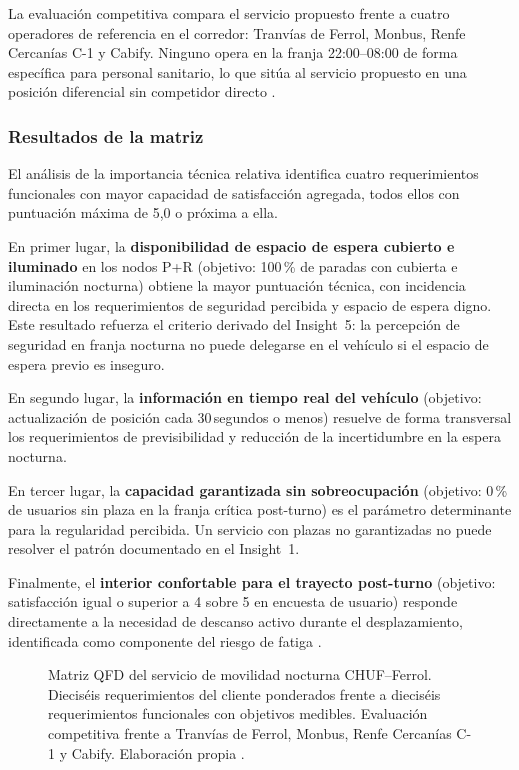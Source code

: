 La evaluación competitiva compara el servicio propuesto frente a cuatro
operadores de referencia en el corredor: Tranvías de Ferrol, Monbus,
Renfe Cercanías C-1 y Cabify. Ninguno opera en la franja 22:00--08:00
de forma específica para personal sanitario, lo que sitúa al servicio
propuesto en una posición diferencial sin competidor directo
\parencite{Alsaferrol2024horarios,RenfeCercaniasFerrol2026}.

\subsubsection{Resultados de la matriz}
\label{sec:qfd-resultados}

El análisis de la importancia técnica relativa identifica cuatro
requerimientos funcionales con mayor capacidad de satisfacción agregada,
todos ellos con puntuación máxima de 5,0 o próxima a ella.

En primer lugar, la \textbf{disponibilidad de espacio de espera cubierto
e iluminado} en los nodos P+R (objetivo: 100\,\% de paradas con cubierta
e iluminación nocturna) obtiene la mayor puntuación técnica, con incidencia
directa en los requerimientos de seguridad percibida y espacio de espera
digno. Este resultado refuerza el criterio derivado del Insight~5: la
percepción de seguridad en franja nocturna no puede delegarse en el
vehículo si el espacio de espera previo es inseguro.

En segundo lugar, la \textbf{información en tiempo real del vehículo}
(objetivo: actualización de posición cada 30\,segundos o menos) resuelve
de forma transversal los requerimientos de previsibilidad y reducción de
la incertidumbre en la espera nocturna.

En tercer lugar, la \textbf{capacidad garantizada sin sobreocupación}
(objetivo: 0\,\% de usuarios sin plaza en la franja crítica post-turno)
es el parámetro determinante para la regularidad percibida. Un servicio
con plazas no garantizadas no puede resolver el patrón documentado en
el Insight~1.

Finalmente, el \textbf{interior confortable para el trayecto post-turno}
(objetivo: satisfacción igual o superior a 4 sobre 5 en encuesta de
usuario) responde directamente a la necesidad de descanso activo durante
el desplazamiento, identificada como componente del riesgo de fatiga
\parencite{LouridoRegueira2026}.

\begin{figure}[htbp]
	\centering
	\fbox{\rule{0pt}{6cm}\rule{0.95\textwidth}{0pt}}
	\caption{Matriz QFD del servicio de movilidad nocturna CHUF--Ferrol.
		Dieciséis requerimientos del cliente ponderados frente a dieciséis
		requerimientos funcionales con objetivos medibles. Evaluación competitiva
		frente a Tranvías de Ferrol, Monbus, Renfe Cercanías C-1 y Cabify.
		Elaboración propia \parencite{LouridoRegueira2026}.}
	\label{fig:qfd}
\end{figure}

